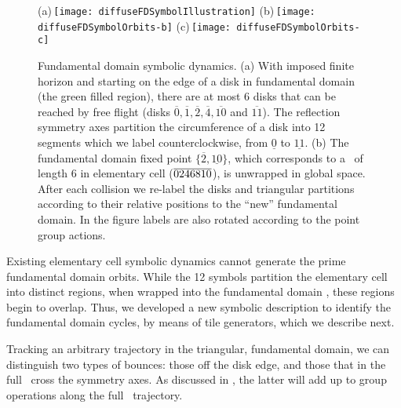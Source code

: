 \begin{figure}[htbp]
  (a)\,\texttt{[image: diffuseFDSymbolIllustration]}
  (b)\,\texttt{[image: diffuseFDSymbolOrbits-b]}
  (c)\,\texttt{[image: diffuseFDSymbolOrbits-c]}
  \caption{\label{fig-fdflights}
  Fundamental domain symbolic dynamics.
  (a) With  imposed finite horizon and starting on the edge of a disk in
  fundamental  domain (the green filled region), there are at most 6
  disks that can be reached by free flight (disks
  $\overline{0},\overline{1},\overline{2},\overline{4},\overline{10}$ and
  $\overline{11}$).
  The reflection symmetry axes partition the circumference of
  a disk into 12 segments which we
  label counterclockwise, from $\underline{0}$ to $\underline{11}$.
  (b) The fundamental domain fixed point
  $\{\overline{2},\underline{10}\}$, which corresponds to a \po\
  of length 6 in elementary cell (${\overline{0246810}}$), is unwrapped
  in   global space. After each collision we re-label the disks and
  triangular   partitions according to their relative positions to the
  ``new'' fundamental   domain. In the figure labels are also rotated
  according to the point   group actions.
  }
\end{figure}

Existing elementary cell symbolic dynamics cannot generate the prime
fundamental domain orbits. While the 12 symbols partition the
elementary cell {\statesp} into distinct regions, when wrapped into
the fundamental domain {\statesp}, these regions begin to overlap.
Thus, we developed a new symbolic description to identify
the fundamental domain cycles, by means of tile generators,
which we describe next.

Tracking an arbitrary trajectory in the triangular, fundamental domain,
we can distinguish two types of bounces: those off the disk edge, and
those that in the full \statesp\ cross the symmetry axes. As discussed in
\refsect{s-FundTranslation}, the latter will add up to group operations
along the full \statesp\ trajectory.


